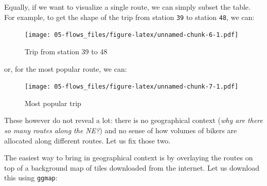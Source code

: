 \documentclass[
]{book}
\newenvironment{Shaded}{\begin{snugshade}}{\end{snugshade}}
\newcommand{\DecValTok}[1]{\textcolor[rgb]{0.00,0.00,0.81}{#1}}
\newcommand{\FunctionTok}[1]{\textcolor[rgb]{0.00,0.00,0.00}{#1}}
\newcommand{\NormalTok}[1]{#1}
\newcommand{\OtherTok}[1]{\textcolor[rgb]{0.56,0.35,0.01}{#1}}
\newcommand{\SpecialCharTok}[1]{\textcolor[rgb]{0.00,0.00,0.00}{#1}}
\begin{document}
Equally, if we want to visualize a single route, we can simply subset the table. For example, to get the shape of the trip from station \texttt{39} to station \texttt{48}, we can:

\begin{Shaded}
\end{Shaded}

\begin{figure}
\centering
\texttt{[image: 05-flows\_files/figure-latex/unnamed-chunk-6-1.pdf]}
\caption{\label{fig:unnamed-chunk-6}Trip from station 39 to 48}
\end{figure}

or, for the most popular route, we can:

\begin{Shaded}
\end{Shaded}

\begin{figure}
\centering
\texttt{[image: 05-flows\_files/figure-latex/unnamed-chunk-7-1.pdf]}
\caption{\label{fig:unnamed-chunk-7}Most popular trip}
\end{figure}

These however do not reveal a lot: there is no geographical context (\emph{why are there so many routes along the NE?}) and no sense of how volumes of bikers are allocated along different routes. Let us fix those two.

The easiest way to bring in geographical context is by overlaying the routes on top of a background map of tiles downloaded from the internet. Let us download this using \texttt{ggmap}:
\end{document}
